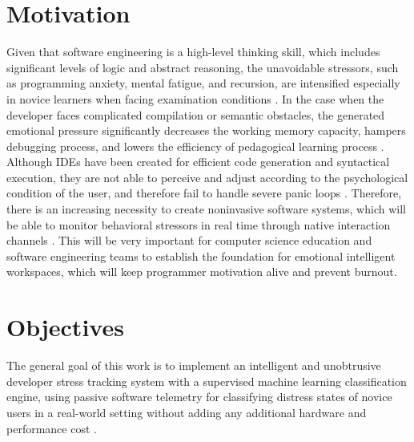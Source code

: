 \section{Motivation}
Given that software engineering is a high-level thinking skill, which includes significant levels of logic and abstract reasoning, the unavoidable stressors, such as programming anxiety, mental fatigue, and recursion, are intensified especially in novice learners when facing examination conditions \cite{acm4897123, springer2020}. In the case when the developer faces complicated compilation or semantic obstacles, the generated emotional pressure significantly decreases the working memory capacity, hampers debugging process, and lowers the efficiency of pedagogical learning process \cite{stemedu2025}. \noindent Although IDEs have been created for efficient code generation and syntactical execution, they are not able to perceive and adjust according to the psychological condition of the user, and therefore fail to handle severe panic loops \cite{mdpi5739}. Therefore, there is an increasing necessity to create noninvasive software systems, which will be able to monitor behavioral stressors in real time through native interaction channels \cite{realtimeStress2012}. This will be very important for computer science education and software engineering teams to establish the foundation for emotional intelligent workspaces, which will keep programmer motivation alive and prevent burnout.

\section{Objectives}
The general goal of this work is to implement an intelligent and unobtrusive developer stress tracking system with a supervised machine learning classification engine, using passive software telemetry for classifying distress states of novice users in a real-world setting without adding any additional hardware and performance cost \cite{mdpi389}.

